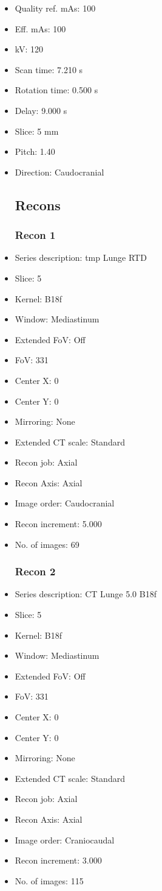 \documentclass[12pt]{article}
\begin{document}
\begin{itemize}
\subsection{Scan}
\item Quality ref. mAs: 100\item Eff. mAs: 100\item kV: 120\item Scan time: 7.210 s\item Rotation time: 0.500 s\item Delay: 9.000 s\item Slice: 5 mm\item Pitch: 1.40\item Direction: Caudocranial\subsection{Recons}

\subsubsection{Recon 1}
\item Series description: tmp Lunge RTD
\item Slice: 5
\item Kernel: B18f
\item Window: Mediastinum
\item Extended FoV: Off
\item FoV: 331
\item Center X: 0
\item Center Y: 0
\item Mirroring: None
\item Extended CT scale: Standard
\item Recon job: Axial
\item Recon Axis: Axial
\item Image order: Caudocranial
\item Recon increment: 5.000
\item No. of images: 69
\subsubsection{Recon 2}
\item Series description: CT Lunge 5.0 B18f
\item Slice: 5
\item Kernel: B18f
\item Window: Mediastinum
\item Extended FoV: Off
\item FoV: 331
\item Center X: 0
\item Center Y: 0
\item Mirroring: None
\item Extended CT scale: Standard
\item Recon job: Axial
\item Recon Axis: Axial
\item Image order: Craniocaudal
\item Recon increment: 3.000
\item No. of images: 115

\end{itemize}
\end{document}
